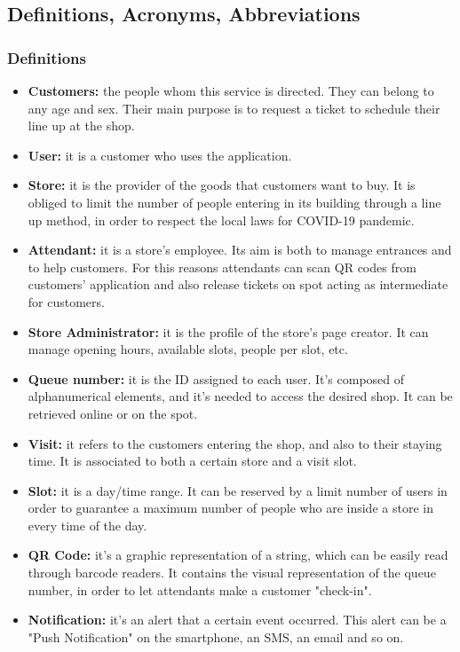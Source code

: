 \documentclass[table, 12pt]{article}
\begin{document}
\begin{flushleft}
    \subsection{Definitions, Acronyms, Abbreviations}
    \subsubsection{Definitions}
    \begin{itemize}
        \item \textbf{Customers:} the people whom this service is directed. They can belong to any age and sex. Their main purpose is to request a ticket to schedule their line up at the shop.
        \item \textbf{User:} it is a customer who uses the application.\label{User}
        \item \textbf{Store:} it is the provider of the goods that customers want to buy. It is obliged to limit the number of people entering in its building through a line up method, in order to respect the local laws for COVID-19 pandemic.
        \item \textbf{Attendant:} it is a store's employee. Its aim is both to manage entrances and to help customers. For this reasons attendants can scan QR codes from customers' application and also release tickets on spot acting as intermediate for customers.
        \item \textbf{Store Administrator:} it is the profile of the store's page creator. It can manage opening hours, available slots, people per slot, etc.
        \item \textbf{Queue number:} it is the ID assigned to each user. It's composed of alphanumerical elements, and it's needed to access the desired shop. It can be retrieved online or on the spot.
        \item \textbf{Visit:} it refers to the customers entering the shop, and also to their staying time. It is associated to both a certain store and a visit slot.
        \item \textbf{Slot:} it is a day/time range. It can be reserved by a limit number of users in order to guarantee a maximum number of people who are inside a store in every time of the day.
        \item \textbf{QR Code:} it's a graphic representation of a string, which can be easily read through barcode readers. It contains the visual representation of the queue number, in order to let attendants make a customer "check-in".\label{QR}
        \item \textbf{Notification:} it's an alert that a certain event occurred. This alert can be a "Push Notification" on the smartphone, an SMS, an email and so on.

\end{itemize}
\end{flushleft}
\end{document}
